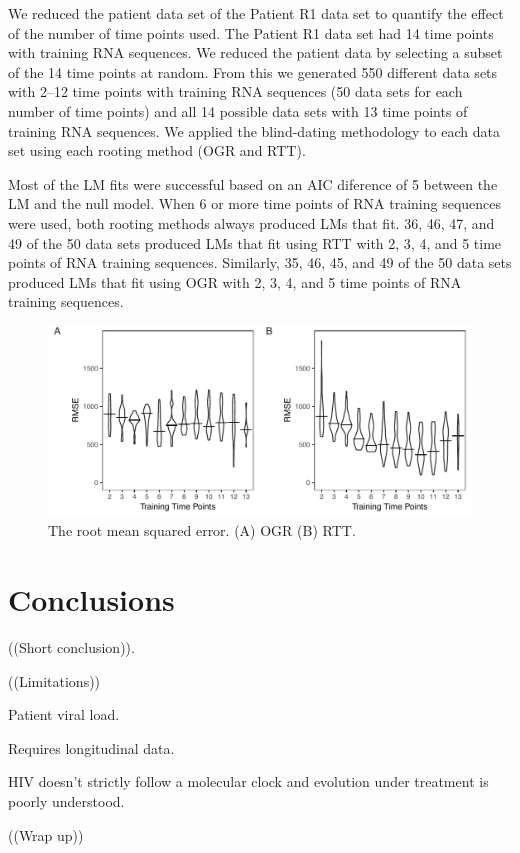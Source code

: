 \documentclass[10pt,twocolumn,twoside]{pnas-new}
\begin{document}
We reduced the patient data set of the Patient R1 data set to quantify the effect of the number of time points used.
The Patient R1 data set had 14 time points with training RNA sequences.
We reduced the patient data by selecting a subset of the 14 time points at random.
From this we generated 550 different data sets with 2--12 time points with training RNA sequences (50 data sets for each number of time points) and all 14 possible data sets with 13 time points of training RNA sequences.
We applied the blind-dating methodology to each data set using each rooting method (OGR and RTT).

Most of the LM fits were successful based on an AIC diference of 5 between the LM and the null model.
When 6 or more time points of RNA training sequences were used, both rooting methods always produced LMs that fit.
36, 46, 47, and 49 of the 50 data sets produced LMs that fit using RTT with 2, 3, 4, and 5 time points of RNA training sequences.
Similarly, 35, 46, 45, and 49 of the 50 data sets produced LMs that fit using OGR with 2, 3, 4, and 5 time points of RNA training sequences. 

\begin{figure}
\includegraphics{sensitivity}
\caption{The root mean squared error.
(A) OGR (B) RTT.}
\label{fig:sensrmse}
\end{figure}

\section*{Conclusions}
((Short conclusion)).

((Limitations))

Patient viral load.

Requires longitudinal data.

HIV doesn't strictly follow a molecular clock and evolution under treatment is poorly understood.

((Wrap up))
\end{document}
